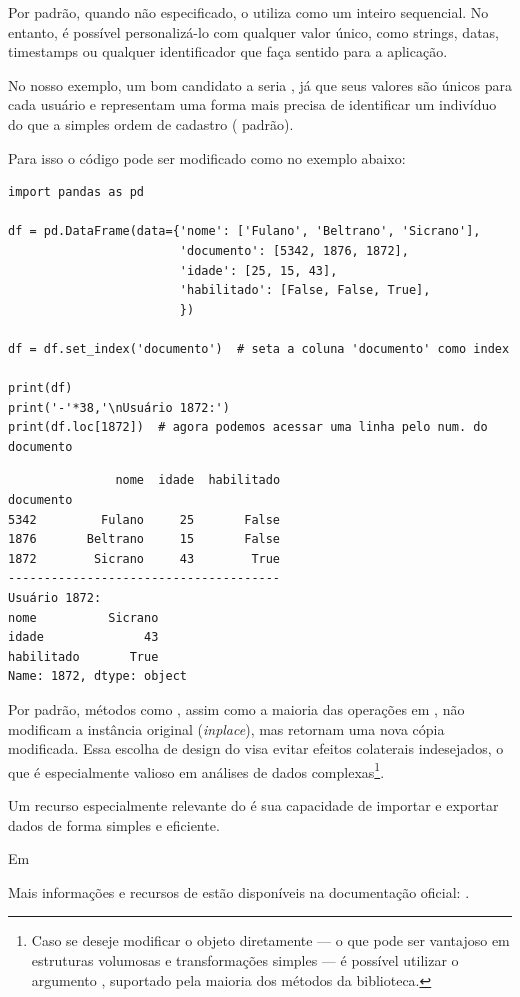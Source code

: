 Por padrão, quando não especificado, o  utiliza como  um inteiro sequencial.
No entanto, é possível personalizá-lo com qualquer valor único, como strings, datas, timestamps ou qualquer identificador que
faça sentido para a aplicação.

No nosso exemplo, um bom candidato a  seria , já que seus valores são únicos para
cada usuário e representam uma forma mais precisa de identificar um indivíduo do que a simples ordem de
cadastro ( padrão).

Para isso o código pode ser modificado como no exemplo abaixo:
\begin{verbatim}
import pandas as pd

df = pd.DataFrame(data={'nome': ['Fulano', 'Beltrano', 'Sicrano'],
                        'documento': [5342, 1876, 1872],
                        'idade': [25, 15, 43],
                        'habilitado': [False, False, True],
                        })

df = df.set_index('documento')  # seta a coluna 'documento' como index

print(df)
print('-'*38,'\nUsuário 1872:')
print(df.loc[1872])  # agora podemos acessar uma linha pelo num. do documento
\end{verbatim}
\begin{verbatim}
               nome  idade  habilitado
documento
5342         Fulano     25       False
1876       Beltrano     15       False
1872        Sicrano     43        True
--------------------------------------
Usuário 1872:
nome          Sicrano
idade              43
habilitado       True
Name: 1872, dtype: object
\end{verbatim}

Por padrão, métodos como , assim como a maioria das operações em ,
não modificam a instância original (\emph{inplace}), mas retornam uma nova cópia modificada.
Essa escolha de design do  visa evitar efeitos colaterais indesejados, o que é especialmente valioso
em análises de dados complexas\footnote{Caso se deseje modificar o objeto diretamente --- o que pode ser vantajoso em
estruturas volumosas e transformações simples --- é possível utilizar o argumento , suportado
pela maioria dos métodos da biblioteca.}.


Um recurso especialmente relevante do  é sua capacidade de importar e exportar dados 
de forma simples e eficiente.

Em 





Mais informações e recursos de  estão disponíveis na documentação oficial:
.
